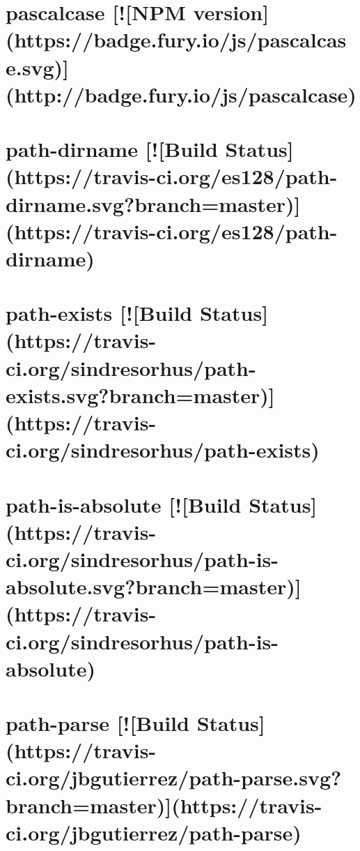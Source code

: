\documentclass[twoside]{book}
\newcommand{\+}{\discretionary{\mbox{\scriptsize$\hookleftarrow$}}{}{}}
\begin{document}
\chapter{pascalcase \mbox{[}!\mbox{[}N\+PM version\mbox{]}(https\+://badge.fury.\+io/js/pascalcase.svg)\mbox{]}(http\+://badge.fury.\+io/js/pascalcase)}
\label{md_dsmacc_vis_degree_node_modules_pascalcase_README}

\chapter{path-\/dirname \mbox{[}!\mbox{[}Build Status\mbox{]}(https\+://travis-\/ci.org/es128/path-\/dirname.svg?branch=master)\mbox{]}(https\+://travis-\/ci.org/es128/path-\/dirname)}
\label{md_dsmacc_vis_degree_node_modules_path-dirname_readme}

\chapter{path-\/exists \mbox{[}!\mbox{[}Build Status\mbox{]}(https\+://travis-\/ci.org/sindresorhus/path-\/exists.svg?branch=master)\mbox{]}(https\+://travis-\/ci.org/sindresorhus/path-\/exists)}
\label{md_dsmacc_vis_degree_node_modules_path-exists_readme}

\chapter{path-\/is-\/absolute \mbox{[}!\mbox{[}Build Status\mbox{]}(https\+://travis-\/ci.org/sindresorhus/path-\/is-\/absolute.svg?branch=master)\mbox{]}(https\+://travis-\/ci.org/sindresorhus/path-\/is-\/absolute)}
\label{md_dsmacc_vis_degree_node_modules_path-is-absolute_readme}

\chapter{path-\/parse \mbox{[}!\mbox{[}Build Status\mbox{]}(https\+://travis-\/ci.org/jbgutierrez/path-\/parse.svg?branch=master)\mbox{]}(https\+://travis-\/ci.org/jbgutierrez/path-\/parse)}
\label{md_dsmacc_vis_degree_node_modules_path-parse_README}

\end{document}

